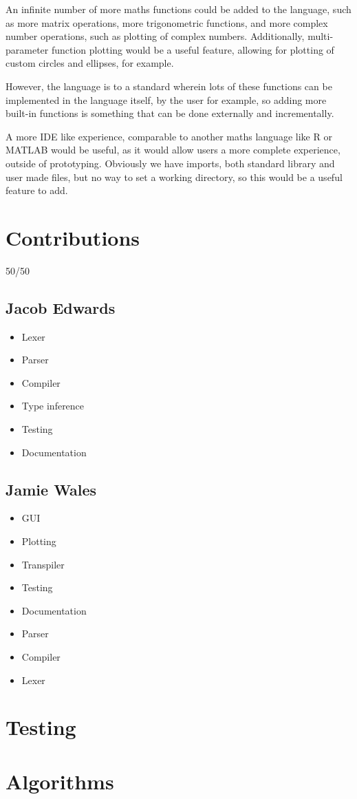 \documentclass[a4paper, oneside, 11pt]{report}
\begin{document}
An infinite number of more maths functions could be added to the language, such as more matrix operations, more
trigonometric functions, and more complex number operations, such as plotting of complex numbers.
Additionally, multi-parameter function plotting would be a useful feature, allowing for plotting of custom circles and
ellipses, for example.

However, the language is to a standard wherein lots of these functions can be implemented in the language itself, by 
the user for example, so adding more built-in functions is something that can be done externally and incrementally.

A more IDE like experience, comparable to another maths language like R or MATLAB would be useful, as it would allow 
users a more complete experience, outside of prototyping.
Obviously we have imports, both standard library and user made files, but no way to set a working 
directory, so this would be a useful feature to add.





\appendix
\chapter{Contributions}\label{ch:contributions}

50/50

\section{Jacob Edwards}\label{sec:jacob-edwards}

\begin{itemize}
    \item Lexer
    \item Parser
    \item Compiler
    \item Type inference
    \item Testing
    \item Documentation
\end{itemize}

\section{Jamie Wales}\label{sec:jamie-wales}

\begin{itemize}
    \item GUI
    \item Plotting
    \item Transpiler
    \item Testing
    \item Documentation
    \item Parser
    \item Compiler
    \item Lexer
\end{itemize}

\chapter{Testing}\label{ch:test}



\chapter{Algorithms}\label{ch:algorithms}


\end{document}
